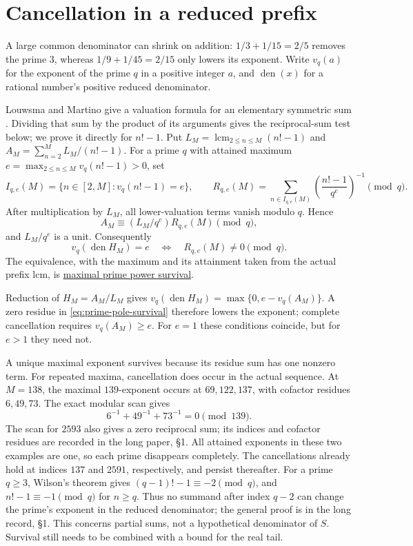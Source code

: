 \documentclass[11pt]{article}
\begin{document}
\section{Cancellation in a reduced prefix}\label{sec:prime-pole}

A large common denominator can shrink on addition: $1/3+1/15=2/5$
removes the prime $3$, whereas $1/9+1/45=2/15$ only lowers its exponent.
Write $v_q(a)$ for the exponent of the prime $q$ in a positive integer $a$,
and $\operatorname{den}(x)$ for a rational number's positive reduced denominator.

Louwsma and Martino give a valuation formula for an elementary symmetric
sum \cite[Lemma~4.1, p.~10]{louwsma-martino}. Dividing that sum by the
product of its arguments gives the reciprocal-sum test below; we prove
it directly for $n!-1$.
Put $L_M=\operatorname{lcm}_{2\le n\le M}(n!-1)$ and
$A_M=\sum_{n=2}^M L_M/(n!-1)$.  For a prime $q$ with attained maximum
$e=\max_{2\le n\le M}v_q(n!-1)>0$, set
\[
I_{q,e}(M)=\{n\in[2,M]:v_q(n!-1)=e\},\qquad
R_{q,e}(M)=\sum_{n\in I_{q,e}(M)}
\left(\frac{n!-1}{q^e}\right)^{-1}\pmod q.
\]
After multiplication by $L_M$, all lower-valuation terms vanish modulo $q$.
Hence
\[
A_M\equiv (L_M/q^e)R_{q,e}(M)\pmod q,
\]
and $L_M/q^e$ is a unit.  Consequently
\begin{equation}
v_q(\operatorname{den}H_M)=e
\quad\Longleftrightarrow\quad R_{q,e}(M)\ne0\pmod q.
\label{eq:prime-pole-survival}
\end{equation}
The equivalence, with the maximum and its attainment taken from the actual
prefix lcm, is \href{https://github.com/wcook04/plectis-erdos/blob/f36a98bf3d3e6f65f1074e3b800e3293d5b8a51a/ErdosProblems/Erdos68/PaperCompletePrimePole.lean#L118}{maximal prime power survival}.

Reduction of $H_M=A_M/L_M$ gives
$v_q(\operatorname{den}H_M)=\max\{0,e-v_q(A_M)\}$.
A zero residue in \eqref{eq:prime-pole-survival} therefore lowers the
exponent; complete cancellation requires $v_q(A_M)\ge e$.
For $e=1$ these conditions coincide, but for $e>1$ they need not.

A unique maximal exponent survives because its residue sum has one nonzero
term. For repeated maxima, cancellation does occur in the actual sequence.
At $M=138$, the maximal $139$-exponent occurs at $69,122,137$,
with cofactor residues $6,49,73$. The exact modular scan gives
\[
6^{-1}+49^{-1}+73^{-1}=0\pmod{139}.
\]
The scan for $2593$ also gives a zero reciprocal sum; its indices and
cofactor residues are recorded in the long paper, \S1. All attained
exponents in these two examples are one, so each prime disappears
completely. The cancellations already hold at indices $137$ and $2591$,
respectively, and persist thereafter. For a prime $q\ge3$, Wilson's theorem gives
$(q-1)!-1\equiv-2\pmod q$, and $n!-1\equiv-1\pmod q$ for $n\ge q$.
Thus no summand after index $q-2$ can change the prime's exponent in the
reduced denominator; the general proof is in the long record, \S1.
This concerns partial sums, not a hypothetical denominator of $S$.
Survival still needs to be combined with a bound for the real tail.
\end{document}

